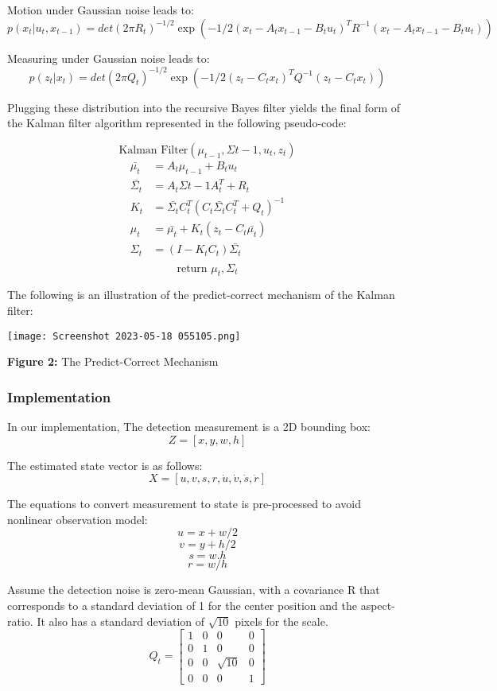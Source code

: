 \documentclass[11pt]{article}
\begin{document}
	Motion under Gaussian noise leads to:
	$$p(x_t | u_t, x_{t-1}) = det(2\pi R_t)^{-1/2} \exp \left( -1/2 (x_t - A_t x_{t-1} - B_t u_t)^T R^{-1} (x_t - A_t x_{t-1} - B_t u_t) \right)$$
	
	Measuring under Gaussian noise leads to:
	$$p(z_t | x_t) = det(2\pi Q_t)^{-1/2} \exp \left( -1/2 (z_t - C_t x_t)^T Q^{-1} (z_t - C_t x_t) \right)$$
	
	Plugging these distribution into the recursive Bayes filter yields the final form of the Kalman filter algorithm represented in the following pseudo-code:
	
$$\textrm{Kalman Filter}(\mu_{t-1}, \Sigma{t-1}, u_t, z_t)$$
\begin{align*}
\bar{\mu_t} &= A_t \mu_{t-1} + B_t u_t\\
\bar{\Sigma_t} &= A_t \Sigma{t-1} A_t^T + R_t\\
K_t &= \bar{\Sigma_t} C_t^T \left( C_t\bar{\Sigma_t} C_t^T + Q_t \right)^{-1}\\
\mu_t &= \bar{\mu_t} + K_t (z_t - C_t\bar{\mu_t})\\
\Sigma_t &= \left( I - K_tC_t \right)\bar{\Sigma_t}\\
\end{align*}	
$$\textrm{return } \mu_t, \Sigma_t$$

The following is an illustration of the predict-correct mechanism of the Kalman filter:
\begin{center}
\texttt{[image: Screenshot 2023-05-18 055105.png]}

\textbf{Figure 2:} The Predict-Correct Mechanism 
\end{center}
\pagebreak
		\subsubsection{Implementation}
	In our implementation, The detection measurement is a 2D bounding box:
	$$Z = [x,y,w,h]$$
	
	The estimated state vector is as follows:
	$$X = [u,v,s,r,\dot{u},\dot{v},\dot{s},\dot{r}]$$
	
	The equations to convert measurement to state is pre-processed to avoid nonlinear observation model:
	$$u = x + w/2$$
	$$v = y + h/2$$
	$$s = w.h$$
	$$r = w/h$$
	
	Assume the detection noise is zero-mean Gaussian, with a covariance R that corresponds to a standard deviation of 1 for the center position and the aspect-ratio. It also has a standard deviation of $\sqrt{10}$ pixels for the scale.
	$$Q_t = \begin{bmatrix}
	1 & 0 & 0 & 0\\
	0 & 1 & 0 & 0\\
	0 & 0 & \sqrt{10} & 0\\
	0 & 0 & 0 & 1
	\end{bmatrix}$$
	
\end{document}
